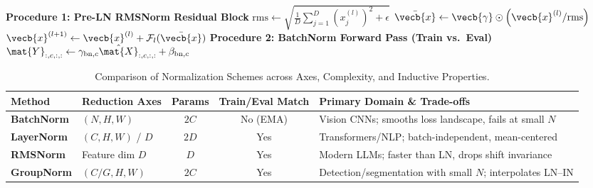 \documentclass[../../../../master.tex]{subfiles}
\begin{document}
\begin{algorithm}[htbp]
\caption{Pre-LN RMSNorm Residual Block \& BatchNorm Train/Eval Execution}
\label{alg:normres:preln_bn}
\BlankLine
\textbf{Procedure 1: Pre-LN RMSNorm Residual Block}\;
$\mathrm{rms} \leftarrow \sqrt{\frac{1}{D}\sum_{j=1}^D \left(x_j^{(l)}\right)^2 + \epsilon}$\;
$\bar{\vecb{x}} \leftarrow \vecb{\gamma} \odot \left(\vecb{x}^{(l)} / \mathrm{rms}\right)$ 
$\vecb{x}^{(l+1)} \leftarrow \vecb{x}^{(l)} + \mathcal{F}_l(\bar{\vecb{x}})$ 
\BlankLine
\textbf{Procedure 2: BatchNorm Forward Pass (Train vs.\ Eval)}\;
$\mat{Y}_{:,c,:,:} \leftarrow \gamma_{\text{bn},c}\hat{\mat{X}}_{:,c,:,:} + \beta_{\text{bn},c}$\;
\end{algorithm}

\begin{table}[htbp]
\centering
\caption{Comparison of Normalization Schemes across Axes, Complexity, and Inductive Properties.}
\label{tab:normres:norm_compare}
\small
\begin{tabularx}{\textwidth}{@{} >{\bfseries}l l c c >{\raggedright\arraybackslash}X @{}}
\toprule
Method & Reduction Axes & Params & Train/Eval Match & Primary Domain \& Trade-offs \\
\midrule
BatchNorm & $(N, H, W)$ & $2C$ & No (EMA) & Vision CNNs; smooths loss landscape, fails at small $N$ \\
LayerNorm & $(C, H, W)$ / $D$ & $2D$ & Yes & Transformers/NLP; batch-independent, mean-centered \\
RMSNorm & Feature dim $D$ & $D$ & Yes & Modern LLMs; faster than LN, drops shift invariance \\
GroupNorm & $(C/G, H, W)$ & $2C$ & Yes & Detection/segmentation with small $N$; interpolates LN--IN \\
\bottomrule
\end{tabularx}
\end{table}
\end{document}
